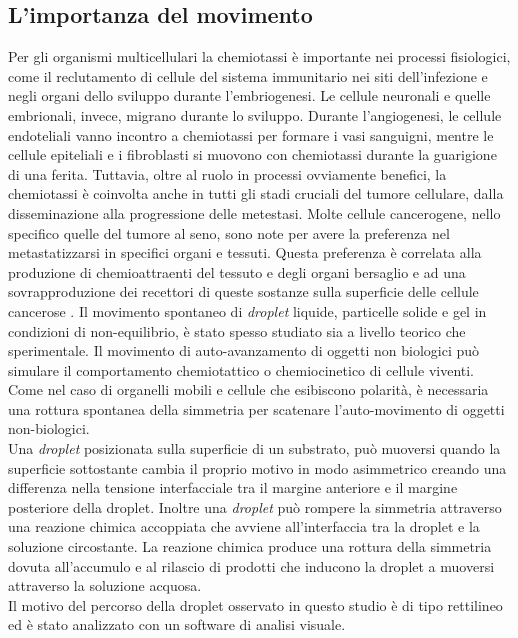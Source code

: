 \subsection{L'importanza del movimento}
\label{sec:00456}
Per gli organismi multicellulari la chemiotassi è importante nei processi fisiologici, come il reclutamento di cellule del sistema immunitario nei siti dell'infezione e negli organi dello sviluppo durante l'embriogenesi.\cite{cellMig} Le cellule neuronali e quelle embrionali, invece, migrano durante lo sviluppo. Durante l'angiogenesi, le cellule endoteliali vanno incontro a chemiotassi per formare i vasi sanguigni, mentre le cellule epiteliali e i fibroblasti si muovono con chemiotassi durante la guarigione di una ferita.\cite{move1} Tuttavia, oltre al ruolo in processi ovviamente benefici, la chemiotassi è coinvolta anche in tutti gli stadi cruciali del tumore cellulare, dalla disseminazione alla progressione delle metestasi. Molte cellule cancerogene, nello specifico quelle del tumore al seno, sono note per avere la preferenza nel metastatizzarsi in specifici organi e tessuti. Questa preferenza è correlata alla produzione di chemioattraenti del tessuto e degli organi bersaglio e ad una sovrapproduzione dei recettori di queste sostanze sulla superficie delle cellule cancerose \cite{chemocancer}.
Il movimento spontaneo di \emph{droplet} liquide, particelle solide e gel in condizioni di non-equilibrio, è stato spesso studiato sia a livello teorico che sperimentale. Il movimento di auto-avanzamento di oggetti non biologici può simulare il comportamento chemiotattico o chemiocinetico di cellule viventi.
Come nel caso di organelli mobili e cellule che esibiscono polarità, è necessaria una rottura spontanea della simmetria per scatenare l'auto-movimento di oggetti non-biologici. 
\\Una \emph{droplet} posizionata sulla superficie di un substrato, può muoversi quando la superficie sottostante cambia il proprio motivo in modo asimmetrico creando una differenza nella tensione interfacciale tra il margine anteriore e il margine posteriore della droplet. Inoltre una \emph{droplet} può rompere la simmetria attraverso una reazione chimica accoppiata che avviene all'interfaccia tra la droplet e la soluzione circostante. La reazione chimica produce una rottura della simmetria dovuta all'accumulo e al rilascio di prodotti che inducono la droplet a muoversi attraverso la soluzione acquosa.\cite{selfpropelled}
\\Il motivo del percorso della droplet osservato in questo studio è di tipo rettilineo ed è stato analizzato con un software di analisi visuale. 

